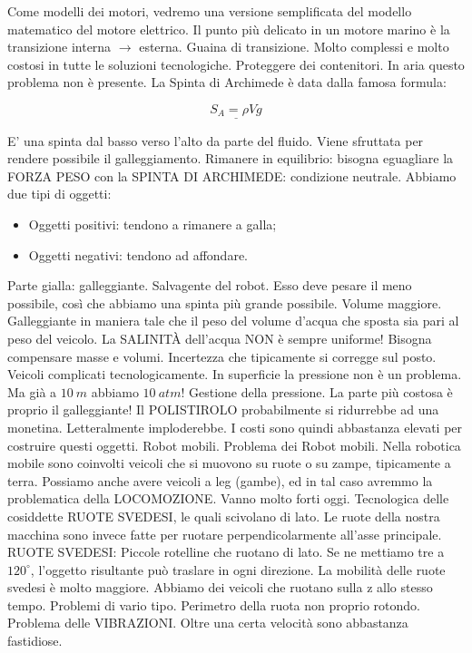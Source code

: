 Come modelli dei motori, vedremo una versione semplificata del modello matematico del motore elettrico. Il punto più delicato in un motore marino è la transizione interna $\rightarrow$ esterna. Guaina di transizione. Molto complessi e molto costosi in tutte le soluzioni tecnologiche. Proteggere dei contenitori. In aria questo problema non è presente. La Spinta di Archimede è data dalla famosa formula:

\[
	\underline{S_A = \rho V g}
\]

E' una spinta dal basso verso l'alto da parte del fluido. Viene sfruttata per rendere possibile il galleggiamento. Rimanere in equilibrio: bisogna eguagliare la FORZA PESO con la SPINTA DI ARCHIMEDE: condizione neutrale. Abbiamo due tipi di oggetti:

\begin{itemize}
\item{Oggetti positivi}: tendono a rimanere a galla;
\item{Oggetti negativi}: tendono ad affondare.
\end{itemize}

Parte gialla: galleggiante. Salvagente del robot. Esso deve pesare il meno possibile, così che abbiamo una spinta più grande possibile. Volume maggiore. Galleggiante in maniera tale che il peso del volume d'acqua che sposta sia pari al peso del veicolo. La SALINIT\`A dell'acqua NON è sempre uniforme! Bisogna compensare masse e volumi. Incertezza che tipicamente si corregge sul posto. Veicoli complicati tecnologicamente. In superficie la pressione non è un problema. Ma già a $10\ m$ abbiamo $10\ atm$! Gestione della pressione. La parte più costosa è proprio il galleggiante! Il POLISTIROLO probabilmente si ridurrebbe ad una monetina. Letteralmente imploderebbe. I costi sono quindi abbastanza elevati per costruire questi oggetti.
Robot mobili. Problema dei Robot mobili. Nella robotica mobile sono coinvolti veicoli che si muovono su ruote o su zampe, tipicamente a terra. Possiamo anche avere veicoli a leg (gambe), ed in tal caso avremmo la problematica della LOCOMOZIONE. Vanno molto forti oggi. Tecnologica delle cosiddette RUOTE SVEDESI, le quali scivolano di lato. Le ruote della nostra macchina sono invece fatte per ruotare perpendicolarmente all'asse principale. RUOTE SVEDESI: Piccole rotelline che ruotano di lato. Se ne mettiamo tre a $120^{\circ}$, l'oggetto risultante può traslare in ogni direzione. La mobilità delle ruote svedesi è molto maggiore. Abbiamo dei veicoli che ruotano sulla z allo stesso tempo. Problemi di vario tipo. Perimetro della ruota non proprio rotondo. Problema delle VIBRAZIONI. Oltre una certa velocità sono abbastanza fastidiose. 